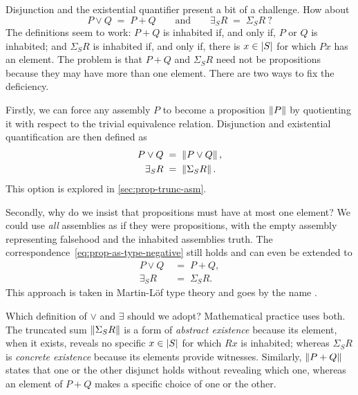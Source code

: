 Disjunction and the existential quantifier present a bit of a challenge. How about
%
\begin{equation*}
  P \lor Q \;=\; P + Q
  \qquad\text{and}\qquad
  \exists_S R \;=\; \Sigma_S R \ ?
\end{equation*}
%
The definitions seem to work: $P + Q$ is inhabited if, and only if, $P$ or $Q$ is inhabited; and $\Sigma_S R$ is inhabited if, and only if, there is $x \in \S{S}$ for which $P x$ has an element. The problem is that $P + Q$ and $\Sigma_S R$ need not be propositions because they may have more than one element. There are two ways to fix the deficiency.

Firstly, we can force any assembly $P$ to become a proposition $\Trunc{P}$ by quotienting it with respect to the trivial equivalence relation. Disjunction and existential quantification are then defined as
%
\begin{equation}
  \label{eq:trunc-or-exists}
  \begin{aligned}
    P \lor Q &\;=\; \Trunc{P \lor Q}, \\
    \exists_S R &\;=\; \Trunc{\Sigma_S R}.
  \end{aligned}
\end{equation}
%
This option is explored in \cref{sec:prop-trunc-asm}.

Secondly, why do we insist that propositions must have at most one element? We could use \emph{all} assemblies as if they were propositions, with the empty assembly representing falsehood and the inhabited assemblies truth. The correspondence~\eqref{eq:prop-as-type-negative} still holds and can even be extended to
%
\begin{align*}
  P \lor Q &\;=\; P + Q, \\
  \exists_S R &\;=\; \Sigma_S R.
\end{align*}
%
This approach is taken in Martin-Löf type theory and goes by the name .

Which definition of $\lor$ and $\exists$ should we adopt? Mathematical practice uses both. The truncated sum $\Trunc{\Sigma_S R}$ is a form of \emph{abstract existence} because its element, when it exists, reveals no specific $x \in \S{S}$ for which $R x$ is inhabited; whereas $\Sigma_S R$ is \emph{concrete existence} because its elements provide witnesses. Similarly, $\Trunc{P + Q}$ states that one or the other disjunct holds without revealing which one, whereas an element of $P + Q$ makes a specific choice of one or the other.


